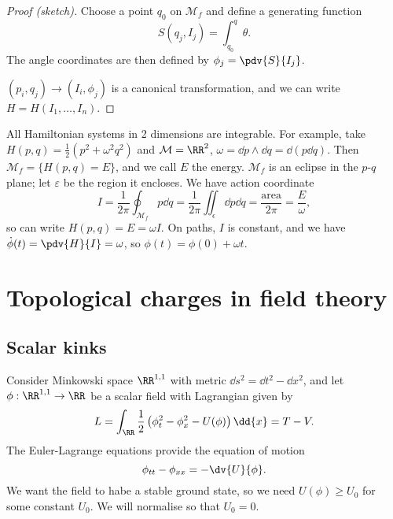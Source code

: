 \documentclass{jknotes}
\begin{document}
\begin{proof}[Proof (sketch)]
    Choose a point \(q_0\) on \(\mathcal{M}_f\) and define a generating function 
    \begin{equation}
        S(q_j,I_j) = \int^q_{q_0}\theta.
    \end{equation}
    The angle coordinates are then defined by \(\phi_j = \pdv{S}{I_j}\).

    \((p_i,q_j) \to (I_i,\phi_j)\) is a canonical transformation, and we can write \(H=H(I_1,\dots,I_n)\).
\end{proof}

\begin{eg}
    All Hamiltonian systems in 2 dimensions are integrable. For example, take \(H(p,q) = \frac{1}{2}(p^2+\omega^2q^2)\) and \(\mathcal{M} = \RR^2\), \(\omega=\dd{p}\wedge\dd{q} = \dd{(p\dd{q})}\). Then \(\mathcal{M}_f = \{H(p,q) = E\}\), and we call \(E\) the energy. \(\mathcal{M}_f\) is an eclipse in the \(p\)-\(q\) plane; let \(\varepsilon\) be the region it encloses. We have action coordinate
    \begin{equation}
        I = \frac{1}{2\pi}\oint_{\mathcal{M}_f}p\dd{q} = \frac{1}{2\pi}\iint_{\epsilon}\dd{p}\dd{q} = \frac{\text{area}}{2\pi} = \frac{E}{\omega},
    \end{equation}
    so can write \(H(p,q) = E=\omega I\). On paths, \(I\) is constant, and we have \(\dot{\phi}(t) = \pdv{H}{I}=\omega\), so \(\phi(t) = \phi(0) + \omega t\).
\end{eg}

\section{Topological charges in field theory}
\subsection{Scalar kinks}

Consider Minkowski space \(\RR^{1,1}\) with metric \(\dd{s}^2 = \dd{t}^2 - \dd{x}^2\), and let \(\phi:\RR^{1,1}\to\RR\) be a scalar field with Lagrangian given by
\begin{equation}
    L = \int_\RR\frac{1}{2}\left(\phi_t^2-\phi_x^2-U(\phi)\right) \dd{x} = T - V.
\end{equation}
The Euler-Lagrange equations provide the equation of motion
\begin{equation}
    \phi_{tt} - \phi_{xx} = - \dv{U}{\phi}.
\end{equation}
We want the field to habe a stable ground state, so we need \(U(\phi)\ge U_0\) for some constant \(U_0\). We will normalise so that \(U_0=0\).
\end{document}
